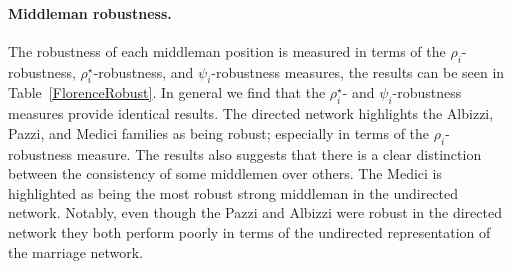 \documentclass[11pt,fleqn]{article}
\begin{document}

\paragraph{Middleman robustness.}


The robustness of each middleman position is measured in terms of the $\rho_{i}$-robustness, $\rho^{\star}_{i}$-robustness, and $\psi_{i}$-robustness measures, the results can be seen in Table~\ref{FlorenceRobust}. In general we find that the $\rho^{\star}_{i}$- and $\psi_{i}$-robustness measures provide identical results. The directed network highlights the Albizzi, Pazzi, and Medici families as being robust; especially in terms of the $\rho_{i}$-robustness measure. The results also suggests that there is a clear distinction between the consistency of some middlemen over others. The Medici is highlighted as being the most robust strong middleman in the undirected network. Notably, even though the Pazzi and Albizzi were robust in the directed network they both perform poorly in terms of the undirected representation of the marriage network.
\end{document}
